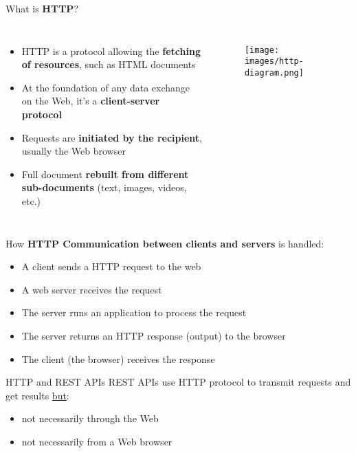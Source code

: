 \documentclass{beamer}[10pt, usepdftitle=false handout]
\begin{document}
\begin{frame}
What is \textbf{HTTP}?
\vspace*{0.6em}

\begin{columns}[c]
\begin{itemize}
	\item{HTTP is a protocol allowing the \textbf{fetching of resources}, such as HTML documents}
	\item{At the foundation of any data exchange on the Web, it's a \textbf{client-server protocol}}
	\item{Requests are \textbf{initiated by the recipient}, usually the Web browser}
	\item{Full document \textbf{rebuilt from different sub-documents} (text, images, videos, etc.)}

\end{itemize}

\begin{figure}
\texttt{[image: images/http-diagram.png]} 
\end{figure}

\end{columns}

\end{frame}

\begin{frame}

How \textbf{HTTP Communication between clients and servers} is handled:
\vspace*{0.6em}

\begin{itemize}
\item{A client sends a HTTP request to the web}
\item{A web server receives the request}
\item{The server runs an application to process the request}
\item{The server returns an HTTP response (output) to the browser}
\item{The client (the browser) receives the response}
\end{itemize}
  
\begin{block}{HTTP and REST APIs}
REST APIs use HTTP protocol to transmit requests and get results \underline{but}:
\begin{itemize}
\item{not necessarily through the Web}
\item{not necessarily from a Web browser}
\end{itemize}
\end{block}


\end{frame}
\end{document}
